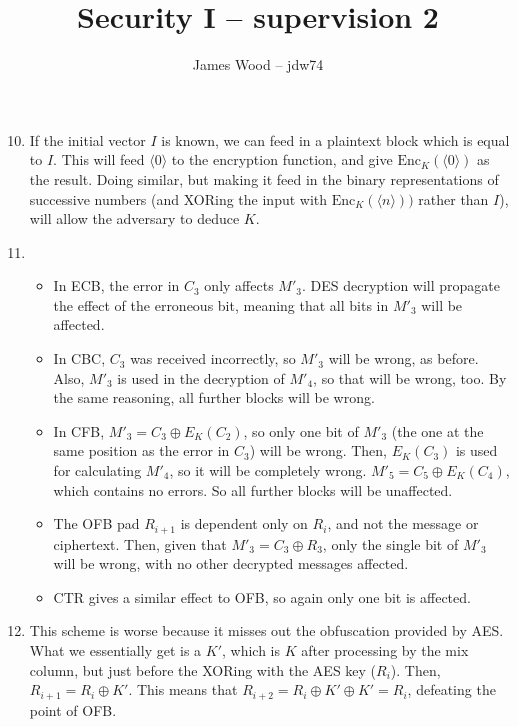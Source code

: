 \documentclass{article}
\begin{document}
\title{Security I -- supervision 2}
\author{James Wood -- jdw74}
\maketitle

\begin{enumerate}
    \setcounter{enumi}{9}
  \item If the initial vector $I$ is known, we can feed in a plaintext block which is equal to $I$. This will feed $\langle 0 \rangle$ to the encryption function, and give $\mathrm{Enc}_K(\langle 0 \rangle)$ as the result. Doing similar, but making it feed in the binary representations of successive numbers (and XORing the input with $\mathrm{Enc}_K(\langle n \rangle))$ rather than $I$), will allow the adversary to deduce $K$.
    \setcounter{enumi}{11}
  \item
    \begin{itemize}
      \item In ECB, the error in $C_3$ only affects $M'_3$. DES decryption will propagate the effect of the erroneous bit, meaning that all bits in $M'_3$ will be affected.
      \item In CBC, $C_3$ was received incorrectly, so $M'_3$ will be wrong, as before. Also, $M'_3$ is used in the decryption of $M'_4$, so that will be wrong, too. By the same reasoning, all further blocks will be wrong.
      \item In CFB, $M'_3 = C_3 \oplus E_K(C_2)$, so only one bit of $M'_3$ (the one at the same position as the error in $C_3$) will be wrong. Then, $E_K(C_3)$ is used for calculating $M'_4$, so it will be completely wrong. $M'_5 = C_5 \oplus E_K(C_4)$, which contains no errors. So all further blocks will be unaffected.
      \item The OFB pad $R_{i+1}$ is dependent only on $R_i$, and not the message or ciphertext. Then, given that $M'_3 = C_3 \oplus R_3$, only the single bit of $M'_3$ will be wrong, with no other decrypted messages affected.
      \item CTR gives a similar effect to OFB, so again only one bit is affected.
    \end{itemize}
  \item This scheme is worse because it misses out the obfuscation provided by AES. What we essentially get is a $K'$, which is $K$ after processing by the mix column, but just before the XORing with the AES key ($R_i$). Then, $R_{i+1} = R_i \oplus K'$. This means that $R_{i+2} = R_i \oplus K' \oplus K' = R_i$, defeating the point of OFB.

\end{enumerate}
\end{document}
